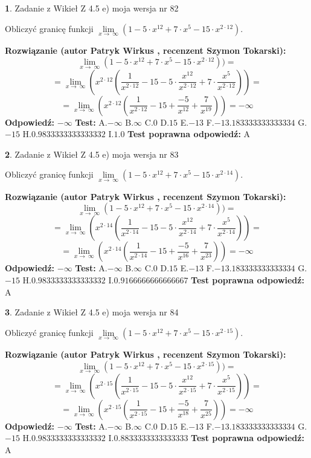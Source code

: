\documentclass[12pt, a4paper]{article}
\theoremstyle{definition} %
\newtheorem{zad}{}
\newcommand{\zadStart}[1]{\begin{zad}#1\newline}
\newcommand{\zadStop}{\end{zad}}
\newcommand{\rozwStart}[2]{\noindent \textbf{Rozwiązanie (autor #1 , recenzent #2): }\newline}
\newcommand{\rozwStop}{\newline}
\newcommand{\odpStart}{\noindent \textbf{Odpowiedź:}\newline}
\newcommand{\odpStop}{\newline}
\newcommand{\testStart}{\noindent \textbf{Test:}\newline}
\newcommand{\testStop}{\newline}
\newcommand{\kluczStart}{\noindent \textbf{Test poprawna odpowiedź:}\newline}
\newcommand{\kluczStop}{\newline}
\begin{document}
\zadStart{Zadanie z Wikieł Z 4.5 e) moja wersja nr 82}


Obliczyć granicę funkcji  $\lim\limits_{x\to\ \infty}(1 - 5 \cdot x^{12}+7 \cdot x^{5}- 15 \cdot x^{2\cdot12})$.
\zadStop
\rozwStart{Patryk Wirkus}{Szymon Tokarski}
$$\lim\limits_{x\to\ \infty}(1 - 5 \cdot x^{12}+7 \cdot x^{5}- 15 \cdot x^{2\cdot12}))=$$
$$=\lim\limits_{x\to\ \infty}(x^{2\cdot12}(\frac{1}{x^{2\cdot12}}-15 -5 \cdot \frac{x^{12}}{x^{2\cdot12}}+7 \cdot \frac{x^{5}}{x^{2\cdot12}}))=$$
$$=\lim\limits_{x\to\ \infty}(x^{2\cdot12}(\frac{1}{x^{2\cdot12}}-15 + \frac{-5}{x^{12}}+ \frac{7}{x^{19}}))=-\infty$$
\rozwStop
\odpStart
$-\infty$
\odpStop
\testStart
A.$-\infty$ B.$\infty$ C.$0$ D.$15$ E.$-13$
F.$-13.183333333333334$ G.$-15$
H.$0.9833333333333332$
I.$1.0$
\testStop
\kluczStart
A
\kluczStop



\zadStart{Zadanie z Wikieł Z 4.5 e) moja wersja nr 83}


Obliczyć granicę funkcji  $\lim\limits_{x\to\ \infty}(1 - 5 \cdot x^{12}+7 \cdot x^{5}- 15 \cdot x^{2\cdot14})$.
\zadStop
\rozwStart{Patryk Wirkus}{Szymon Tokarski}
$$\lim\limits_{x\to\ \infty}(1 - 5 \cdot x^{12}+7 \cdot x^{5}- 15 \cdot x^{2\cdot14}))=$$
$$=\lim\limits_{x\to\ \infty}(x^{2\cdot14}(\frac{1}{x^{2\cdot14}}-15 -5 \cdot \frac{x^{12}}{x^{2\cdot14}}+7 \cdot \frac{x^{5}}{x^{2\cdot14}}))=$$
$$=\lim\limits_{x\to\ \infty}(x^{2\cdot14}(\frac{1}{x^{2\cdot14}}-15 + \frac{-5}{x^{16}}+ \frac{7}{x^{23}}))=-\infty$$
\rozwStop
\odpStart
$-\infty$
\odpStop
\testStart
A.$-\infty$ B.$\infty$ C.$0$ D.$15$ E.$-13$
F.$-13.183333333333334$ G.$-15$
H.$0.9833333333333332$
I.$0.9166666666666667$
\testStop
\kluczStart
A
\kluczStop



\zadStart{Zadanie z Wikieł Z 4.5 e) moja wersja nr 84}


Obliczyć granicę funkcji  $\lim\limits_{x\to\ \infty}(1 - 5 \cdot x^{12}+7 \cdot x^{5}- 15 \cdot x^{2\cdot15})$.
\zadStop
\rozwStart{Patryk Wirkus}{Szymon Tokarski}
$$\lim\limits_{x\to\ \infty}(1 - 5 \cdot x^{12}+7 \cdot x^{5}- 15 \cdot x^{2\cdot15}))=$$
$$=\lim\limits_{x\to\ \infty}(x^{2\cdot15}(\frac{1}{x^{2\cdot15}}-15 -5 \cdot \frac{x^{12}}{x^{2\cdot15}}+7 \cdot \frac{x^{5}}{x^{2\cdot15}}))=$$
$$=\lim\limits_{x\to\ \infty}(x^{2\cdot15}(\frac{1}{x^{2\cdot15}}-15 + \frac{-5}{x^{18}}+ \frac{7}{x^{25}}))=-\infty$$
\rozwStop
\odpStart
$-\infty$
\odpStop
\testStart
A.$-\infty$ B.$\infty$ C.$0$ D.$15$ E.$-13$
F.$-13.183333333333334$ G.$-15$
H.$0.9833333333333332$
I.$0.8833333333333333$
\testStop
\kluczStart
A
\kluczStop
\end{document}
